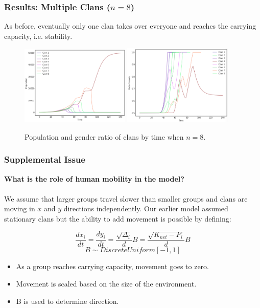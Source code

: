 \documentclass[t]{beamer}
\begin{document}
\begin{frame}
\frametitle{Results: Multiple Clans ($n=8$)}
As before, eventually only one clan takes over everyone and reaches the carrying capacity, i.e. stability.

\begin{figure}
\includegraphics[width=5.2cm]{multclanpop.png}
\includegraphics[width=5.2cm]{mclanratio.png}
\caption{Population and gender ratio of clans by time when $n=8$.}
\end{figure}

\end{frame}


\begin{frame}
\frametitle{Supplemental Issue}
\textbf{What is the role of human mobility in the model?}\\~\\

We assume that larger groups travel slower than smaller groups and clans are moving in $x$ and $y$ directions independently. Our earlier model assumed stationary clans but the ability to add movement is possible by defining:

$$ \frac{dx_i}{dt} = \frac{dy_i}{dt} = \frac{\sqrt{\Delta_i}}{d}B = \frac{\sqrt{K_{net} - P_i}}{d}B$$
$$ B \sim Discrete Uniform[-1, 1]$$

\begin{itemize}
    \item As a group reaches carrying capacity, movement goes to zero. 
    \item Movement is scaled based on the size of the environment. 
    \item B is used to determine direction.
\end{itemize}

\end{frame}
\end{document}
